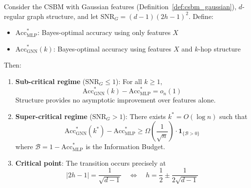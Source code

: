 \begin{theorem}
\label{thm:gnn_mlp_phase_transition}
Consider the CSBM with Gaussian features (Definition~\ref{def:csbm_gaussian}), $d$-regular graph structure, and let $\mathrm{SNR}_G = (d-1)(2h-1)^2$. Define:
\begin{itemize}
    \item $\mathrm{Acc}_{\mathrm{MLP}}^*$: Bayes-optimal accuracy using only features $X$
    \item $\mathrm{Acc}_{\mathrm{GNN}}^*(k)$: Bayes-optimal accuracy using features $X$ and $k$-hop structure
\end{itemize}
Then:
\begin{enumerate}
    \item \textbf{Sub-critical regime} ($\mathrm{SNR}_G \leq 1$): For all $k \geq 1$,
    \begin{equation}
        \mathrm{Acc}_{\mathrm{GNN}}^*(k) - \mathrm{Acc}_{\mathrm{MLP}}^* = o_n(1)
    \end{equation}
    Structure provides no asymptotic improvement over features alone.

    \item \textbf{Super-critical regime} ($\mathrm{SNR}_G > 1$): There exists $k^* = O(\log n)$ such that
    \begin{equation}
        \mathrm{Acc}_{\mathrm{GNN}}^*(k^*) - \mathrm{Acc}_{\mathrm{MLP}}^* \geq \Omega\left(\frac{1}{\sqrt{n}}\right) \cdot \mathbf{1}_{\{\mathcal{B} > 0\}}
    \end{equation}
    where $\mathcal{B} = 1 - \mathrm{Acc}_{\mathrm{MLP}}^*$ is the Information Budget.

    \item \textbf{Critical point}: The transition occurs precisely at
    \begin{equation}
        |2h - 1| = \frac{1}{\sqrt{d-1}} \quad \Leftrightarrow \quad h = \frac{1}{2} \pm \frac{1}{2\sqrt{d-1}}
    \end{equation}
\end{enumerate}
\end{theorem}

